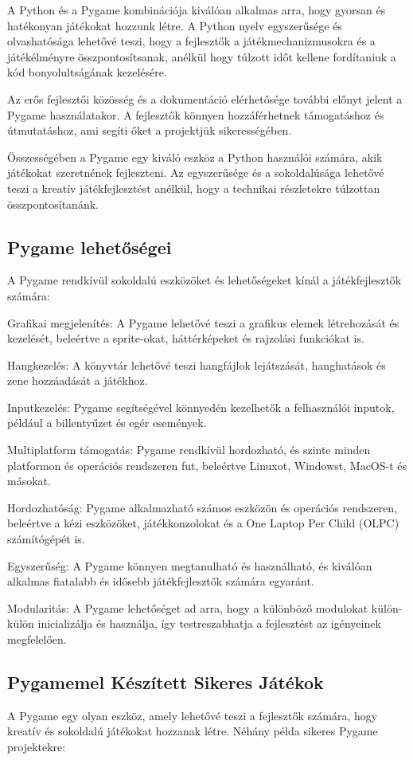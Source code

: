A Python és a Pygame kombinációja kiválóan alkalmas arra, hogy gyorsan és hatékonyan játékokat hozzunk létre. A Python nyelv egyszerűsége és olvashatósága lehetővé teszi, hogy a fejlesztők a játékmechanizmusokra és a játékélményre összpontosítsanak, anélkül hogy túlzott időt kellene fordítaniuk a kód bonyolultságának kezelésére.

Az erős fejlesztői közösség és a dokumentáció elérhetősége további előnyt jelent a Pygame használatakor. A fejlesztők könnyen hozzáférhetnek támogatáshoz és útmutatáshoz, ami segíti őket a projektjük sikerességében.

Összességében a Pygame egy kiváló eszköz a Python használói számára, akik játékokat szeretnének fejleszteni. Az egyszerűsége és a sokoldalúsága lehetővé teszi a kreatív játékfejlesztést anélkül, hogy a technikai részletekre túlzottan összpontosítanánk.
\subsection{Pygame lehetőségei}
A Pygame rendkívül sokoldalú eszközöket és lehetőségeket kínál a játékfejlesztők számára:

Grafikai megjelenítés: A Pygame lehetővé teszi a grafikus elemek létrehozását és kezelését, beleértve a sprite-okat, háttérképeket és rajzolási funkciókat is.

Hangkezelés: A könyvtár lehetővé teszi hangfájlok lejátszását, hanghatások és zene hozzáadását a játékhoz.

Inputkezelés: Pygame segítségével könnyedén kezelhetők a felhasználói inputok, például a billentyűzet és egér események.

Multiplatform támogatás: Pygame rendkívül hordozható, és szinte minden platformon és operációs rendszeren fut, beleértve Linuxot, Windowst, MacOS-t és másokat.

Hordozhatóság: Pygame alkalmazható számos eszközön és operációs rendszeren, beleértve a kézi eszközöket, játékkonzolokat és a One Laptop Per Child (OLPC) számítógépét is.

Egyszerűség: A Pygame könnyen megtanulható és használható, és kiválóan alkalmas fiatalabb és idősebb játékfejlesztők számára egyaránt.

Modularitás: A Pygame lehetőséget ad arra, hogy a különböző modulokat külön-külön inicializálja és használja, így testreszabhatja a fejlesztést az igényeinek megfelelően.



\subsection{Pygamemel Készített Sikeres Játékok}
A Pygame egy olyan eszköz, amely lehetővé teszi a fejlesztők számára, hogy kreatív és sokoldalú játékokat hozzanak létre. Néhány példa sikeres Pygame projektekre:

